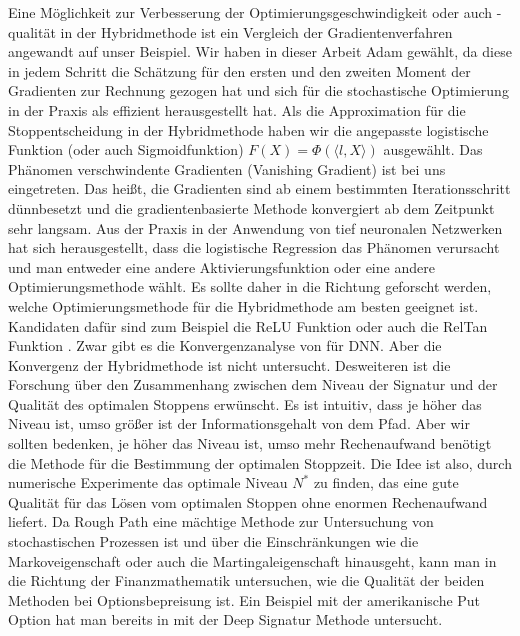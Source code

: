\documentclass[12pt,titlepage,headsepline]{article}
\begin{document}
      Eine Möglichkeit zur Verbesserung der Optimierungsgeschwindigkeit oder auch -qualität in der Hybridmethode ist ein Vergleich der Gradientenverfahren angewandt auf unser Beispiel. Wir haben in dieser Arbeit Adam gewählt, da diese in jedem Schritt die Schätzung für den ersten und den zweiten Moment der Gradienten zur Rechnung gezogen hat und sich für die stochastische Optimierung in der Praxis als effizient herausgestellt hat. Als die Approximation für die Stoppentscheidung in der Hybridmethode haben wir die angepasste logistische Funktion (oder auch Sigmoidfunktion) $F(X)=\Phi(\langle l, X \rangle)$ ausgewählt. Das Phänomen verschwindente Gradienten (Vanishing Gradient) ist bei uns eingetreten. Das heißt, die Gradienten sind ab einem bestimmten Iterationsschritt dünnbesetzt und die gradientenbasierte Methode konvergiert ab dem Zeitpunkt sehr langsam. Aus der Praxis in der Anwendung von tief neuronalen Netzwerken hat sich herausgestellt, dass die logistische Regression das Phänomen verursacht und man entweder eine andere Aktivierungsfunktion oder eine andere Optimierungsmethode wählt. Es sollte daher in die Richtung geforscht werden, welche Optimierungsmethode für die Hybridmethode am besten geeignet ist. Kandidaten dafür sind zum Beispiel die ReLU Funktion oder auch die RelTan Funktion \cite{wang_reltanh_2019}.
      \hfill\break
      Zwar gibt es die Konvergenzanalyse von \cite{becker_deep_2019} für DNN. Aber die Konvergenz der Hybridmethode ist nicht untersucht. Desweiteren ist die Forschung über den Zusammenhang zwischen dem Niveau der Signatur und der Qualität des optimalen Stoppens erwünscht. Es ist intuitiv, dass je höher das Niveau ist, umso größer ist der Informationsgehalt von dem Pfad. Aber wir sollten bedenken, je höher das Niveau ist, umso mehr Rechenaufwand benötigt die Methode für die Bestimmung der optimalen Stoppzeit. Die Idee ist also, durch numerische Experimente das optimale Niveau $N^*$ zu finden, das eine gute Qualität für das Lösen vom optimalen Stoppen ohne enormen Rechenaufwand liefert.
      \hfill\break
      Da Rough Path eine mächtige Methode zur Untersuchung von stochastischen Prozessen ist und über die Einschränkungen wie die Markoveigenschaft oder auch die Martingaleigenschaft hinausgeht, kann man in die Richtung der Finanzmathematik untersuchen, wie die Qualität der beiden Methoden bei Optionsbepreisung ist. Ein Beispiel mit der amerikanische Put Option hat man bereits in \cite{bayer_optimal_2020} mit der Deep Signatur Methode untersucht.

      \newpage
\end{document}

